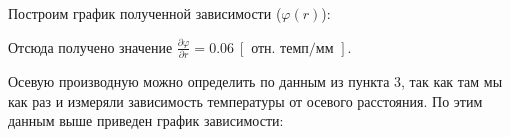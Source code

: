 \documentclass[a4paper,11.5pt]{article} %
\begin{document}
Построим график полученной зависимости ($\varphi (r)$):
\newpage
\begin{figure}
	\label{gr:1}
\end{figure}

Отсюда получено значение $\frac{\partial \varphi}{\partial r} = 0.06 \ [\text{ отн. темп} / \text{мм }].$

Осевую производную можно определить по данным из пункта 3, так как там мы как раз и измеряли зависимость температуры от осевого расстояния. По этим данным выше приведен график зависимости:

\begin{figure}
	\label{gr:2}
\end{figure}
\end{document}
